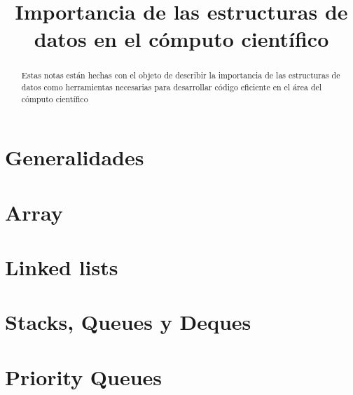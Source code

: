 \documentclass[11pt,letterpaper]{article}
\begin{document}
\title{Importancia de las estructuras de datos en el cómputo científico}
\maketitle

\begin{abstract}
Estas notas están hechas con el objeto de describir la importancia de las estructuras de datos como herramientas necesarias para desarrollar código eficiente en el área del cómputo científico
\end{abstract}

\section{Generalidades}

\section{Array}

\section{Linked lists}

\section{Stacks, Queues y Deques}

\section{Priority Queues}
\end{document}
